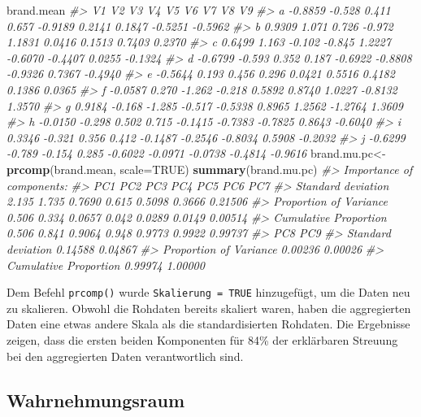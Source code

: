 \documentclass[12pt,]{book}
\makeatletter
\newenvironment{Shaded}{\begin{snugshade}}{\end{snugshade}}
\newcommand{\KeywordTok}[1]{\textcolor[rgb]{0.13,0.29,0.53}{\textbf{{#1}}}}
\newcommand{\DataTypeTok}[1]{\textcolor[rgb]{0.13,0.29,0.53}{{#1}}}
\newcommand{\StringTok}[1]{\textcolor[rgb]{0.31,0.60,0.02}{{#1}}}
\newcommand{\CommentTok}[1]{\textcolor[rgb]{0.56,0.35,0.01}{\textit{{#1}}}}
\newcommand{\OtherTok}[1]{\textcolor[rgb]{0.56,0.35,0.01}{{#1}}}
\newcommand{\NormalTok}[1]{{#1}}
\newenvironment{kframe}{%
\medskip{}
\setlength{\fboxsep}{.8em}
 \def\at@end@of@kframe{}%
 \ifinner\ifhmode%
  \def\at@end@of@kframe{\end{minipage}}%
  \begin{minipage}{\columnwidth}%
 \fi\fi%
 \def\FrameCommand##1{\hskip\@totalleftmargin \hskip-\fboxsep
 \colorbox{shadecolor}{##1}\hskip-\fboxsep
     \hskip-\linewidth \hskip-\@totalleftmargin \hskip\columnwidth}%
 \MakeFramed {\advance\hsize-\width
   \@totalleftmargin\z@ \linewidth\hsize
   \@setminipage}}%
 {\par\unskip\endMakeFramed%
 \at@end@of@kframe}
\renewenvironment{Shaded}{\begin{kframe}}{\end{kframe}}
\makeatother
\begin{document}
\begin{Shaded}
\begin{Highlighting}[]
\NormalTok{brand.mean}
\CommentTok{#>        V1     V2     V3     V4      V5      V6      V7      V8      V9}
\CommentTok{#> a -0.8859 -0.528  0.411  0.657 -0.9189  0.2141  0.1847 -0.5251 -0.5962}
\CommentTok{#> b  0.9309  1.071  0.726 -0.972  1.1831  0.0416  0.1513  0.7403  0.2370}
\CommentTok{#> c  0.6499  1.163 -0.102 -0.845  1.2227 -0.6070 -0.4407  0.0255 -0.1324}
\CommentTok{#> d -0.6799 -0.593  0.352  0.187 -0.6922 -0.8808 -0.9326  0.7367 -0.4940}
\CommentTok{#> e -0.5644  0.193  0.456  0.296  0.0421  0.5516  0.4182  0.1386  0.0365}
\CommentTok{#> f -0.0587  0.270 -1.262 -0.218  0.5892  0.8740  1.0227 -0.8132  1.3570}
\CommentTok{#> g  0.9184 -0.168 -1.285 -0.517 -0.5338  0.8965  1.2562 -1.2764  1.3609}
\CommentTok{#> h -0.0150 -0.298  0.502  0.715 -0.1415 -0.7383 -0.7825  0.8643 -0.6040}
\CommentTok{#> i  0.3346 -0.321  0.356  0.412 -0.1487 -0.2546 -0.8034  0.5908 -0.2032}
\CommentTok{#> j -0.6299 -0.789 -0.154  0.285 -0.6022 -0.0971 -0.0738 -0.4814 -0.9616}
\NormalTok{brand.mu.pc<-}\StringTok{ }\KeywordTok{prcomp}\NormalTok{(brand.mean, }\DataTypeTok{scale=}\OtherTok{TRUE}\NormalTok{)}
\KeywordTok{summary}\NormalTok{(brand.mu.pc)}
\CommentTok{#> Importance of components:}
\CommentTok{#>                          PC1   PC2    PC3   PC4    PC5    PC6     PC7}
\CommentTok{#> Standard deviation     2.135 1.735 0.7690 0.615 0.5098 0.3666 0.21506}
\CommentTok{#> Proportion of Variance 0.506 0.334 0.0657 0.042 0.0289 0.0149 0.00514}
\CommentTok{#> Cumulative Proportion  0.506 0.841 0.9064 0.948 0.9773 0.9922 0.99737}
\CommentTok{#>                            PC8     PC9}
\CommentTok{#> Standard deviation     0.14588 0.04867}
\CommentTok{#> Proportion of Variance 0.00236 0.00026}
\CommentTok{#> Cumulative Proportion  0.99974 1.00000}
\end{Highlighting}
\end{Shaded}

Dem Befehl \texttt{prcomp()} wurde \texttt{Skalierung\ =\ TRUE}
hinzugefügt, um die Daten neu zu skalieren. Obwohl die Rohdaten bereits
skaliert waren, haben die aggregierten Daten eine etwas andere Skala als
die standardisierten Rohdaten. Die Ergebnisse zeigen, dass die ersten
beiden Komponenten für 84\% der erklärbaren Streuung bei den
aggregierten Daten verantwortlich sind.

\subsection{Wahrnehmungsraum}\label{wahrnehmungsraum}
\end{document}
